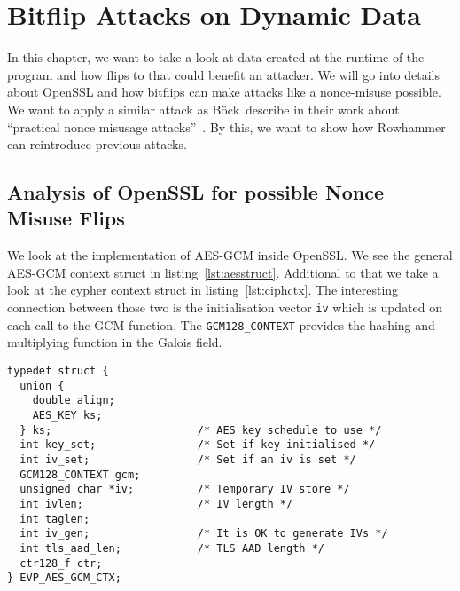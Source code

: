 \chapter{Bitflip Attacks on Dynamic Data}\label{sec:dynattack}

In this chapter, we want to take a look at data created at the runtime of the
program and how flips to that could benefit an attacker. We will go into details
about OpenSSL and how bitflips can make attacks like a nonce-misuse possible. We
want to apply a similar attack as Böck~\etal describe in their work about ``practical nonce misusage
attacks''~\cite{gcmnonceattack}. By this, we want to show how
Rowhammer can reintroduce previous attacks.

\section{Analysis of OpenSSL for possible Nonce Misuse Flips}

We look at the implementation of AES-GCM inside OpenSSL. We see the general
AES-GCM context struct in listing~\ref{lst:aesstruct}. Additional to that we
take a look at the cypher context struct in listing~\ref{lst:ciphctx}. The
interesting connection between those two is the initialisation vector
\texttt{iv} which is updated on each call to the GCM function. The
\texttt{GCM128\_CONTEXT} provides the hashing and multiplying function in the
Galois field.

\begin{minipage}{\linewidth}
\begin{lstlisting}[style=CStyle,
                   caption={Struct used by OpenSSL to describe the AES-GCM
context. The IV used is stored in the memory pointed to by \texttt{iv}. Source
is taken from OpenSSL version $1.1.0g$},
                   label={lst:aesstruct}]
typedef struct {
  union {
    double align;
    AES_KEY ks;
  } ks;                       /* AES key schedule to use */
  int key_set;                /* Set if key initialised */
  int iv_set;                 /* Set if an iv is set */
  GCM128_CONTEXT gcm;
  unsigned char *iv;          /* Temporary IV store */
  int ivlen;                  /* IV length */
  int taglen;
  int iv_gen;                 /* It is OK to generate IVs */
  int tls_aad_len;            /* TLS AAD length */
  ctr128_f ctr;
} EVP_AES_GCM_CTX;
\end{lstlisting}
\end{minipage}

